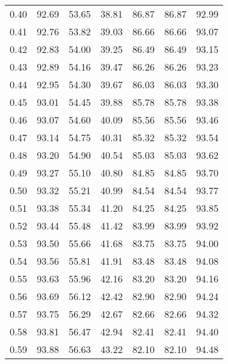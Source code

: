 \begin{tabular}{|c|c|c|c|c|c|c|}
      0.40 &     92.69 &     53.65 &      38.81 &   86.87 &      86.87 &         92.99 \\
      0.41 &     92.76 &     53.82 &      39.03 &   86.66 &      86.66 &         93.07 \\
      0.42 &     92.83 &     54.00 &      39.25 &   86.49 &      86.49 &         93.15 \\
      0.43 &     92.89 &     54.16 &      39.47 &   86.26 &      86.26 &         93.23 \\
      0.44 &     92.95 &     54.30 &      39.67 &   86.03 &      86.03 &         93.30 \\
      0.45 &     93.01 &     54.45 &      39.88 &   85.78 &      85.78 &         93.38 \\
      0.46 &     93.07 &     54.60 &      40.09 &   85.56 &      85.56 &         93.46 \\
      0.47 &     93.14 &     54.75 &      40.31 &   85.32 &      85.32 &         93.54 \\
      0.48 &     93.20 &     54.90 &      40.54 &   85.03 &      85.03 &         93.62 \\
      0.49 &     93.27 &     55.10 &      40.80 &   84.85 &      84.85 &         93.70 \\
      0.50 &     93.32 &     55.21 &      40.99 &   84.54 &      84.54 &         93.77 \\
      0.51 &     93.38 &     55.34 &      41.20 &   84.25 &      84.25 &         93.85 \\
      0.52 &     93.44 &     55.48 &      41.42 &   83.99 &      83.99 &         93.92 \\
      0.53 &     93.50 &     55.66 &      41.68 &   83.75 &      83.75 &         94.00 \\
      0.54 &     93.56 &     55.81 &      41.91 &   83.48 &      83.48 &         94.08 \\
      0.55 &     93.63 &     55.96 &      42.16 &   83.20 &      83.20 &         94.16 \\
      0.56 &     93.69 &     56.12 &      42.42 &   82.90 &      82.90 &         94.24 \\
      0.57 &     93.75 &     56.29 &      42.67 &   82.66 &      82.66 &         94.32 \\
      0.58 &     93.81 &     56.47 &      42.94 &   82.41 &      82.41 &         94.40 \\
      0.59 &     93.88 &     56.63 &      43.22 &   82.10 &      82.10 &         94.48 \\

\end{tabular}
